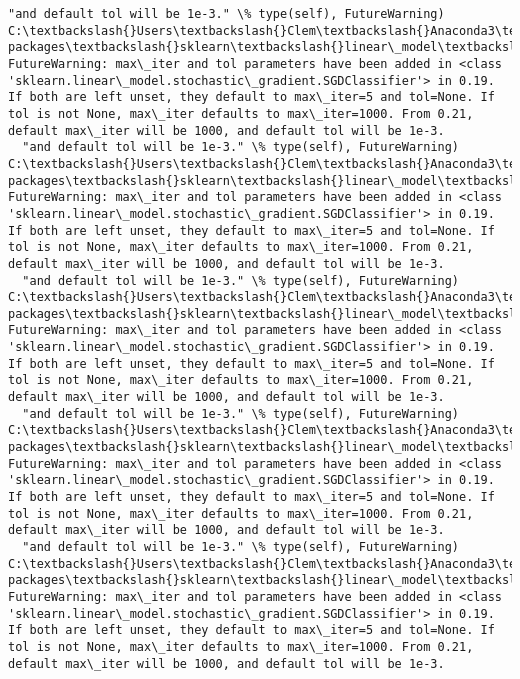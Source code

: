 \documentclass[11pt]{article}
\begin{document}
\begin{Verbatim}[commandchars=\\\{\}]
  "and default tol will be 1e-3." \% type(self), FutureWarning)
C:\textbackslash{}Users\textbackslash{}Clem\textbackslash{}Anaconda3\textbackslash{}lib\textbackslash{}site-packages\textbackslash{}sklearn\textbackslash{}linear\_model\textbackslash{}stochastic\_gradient.py:128: FutureWarning: max\_iter and tol parameters have been added in <class 'sklearn.linear\_model.stochastic\_gradient.SGDClassifier'> in 0.19. If both are left unset, they default to max\_iter=5 and tol=None. If tol is not None, max\_iter defaults to max\_iter=1000. From 0.21, default max\_iter will be 1000, and default tol will be 1e-3.
  "and default tol will be 1e-3." \% type(self), FutureWarning)
C:\textbackslash{}Users\textbackslash{}Clem\textbackslash{}Anaconda3\textbackslash{}lib\textbackslash{}site-packages\textbackslash{}sklearn\textbackslash{}linear\_model\textbackslash{}stochastic\_gradient.py:128: FutureWarning: max\_iter and tol parameters have been added in <class 'sklearn.linear\_model.stochastic\_gradient.SGDClassifier'> in 0.19. If both are left unset, they default to max\_iter=5 and tol=None. If tol is not None, max\_iter defaults to max\_iter=1000. From 0.21, default max\_iter will be 1000, and default tol will be 1e-3.
  "and default tol will be 1e-3." \% type(self), FutureWarning)
C:\textbackslash{}Users\textbackslash{}Clem\textbackslash{}Anaconda3\textbackslash{}lib\textbackslash{}site-packages\textbackslash{}sklearn\textbackslash{}linear\_model\textbackslash{}stochastic\_gradient.py:128: FutureWarning: max\_iter and tol parameters have been added in <class 'sklearn.linear\_model.stochastic\_gradient.SGDClassifier'> in 0.19. If both are left unset, they default to max\_iter=5 and tol=None. If tol is not None, max\_iter defaults to max\_iter=1000. From 0.21, default max\_iter will be 1000, and default tol will be 1e-3.
  "and default tol will be 1e-3." \% type(self), FutureWarning)
C:\textbackslash{}Users\textbackslash{}Clem\textbackslash{}Anaconda3\textbackslash{}lib\textbackslash{}site-packages\textbackslash{}sklearn\textbackslash{}linear\_model\textbackslash{}stochastic\_gradient.py:128: FutureWarning: max\_iter and tol parameters have been added in <class 'sklearn.linear\_model.stochastic\_gradient.SGDClassifier'> in 0.19. If both are left unset, they default to max\_iter=5 and tol=None. If tol is not None, max\_iter defaults to max\_iter=1000. From 0.21, default max\_iter will be 1000, and default tol will be 1e-3.
  "and default tol will be 1e-3." \% type(self), FutureWarning)
C:\textbackslash{}Users\textbackslash{}Clem\textbackslash{}Anaconda3\textbackslash{}lib\textbackslash{}site-packages\textbackslash{}sklearn\textbackslash{}linear\_model\textbackslash{}stochastic\_gradient.py:128: FutureWarning: max\_iter and tol parameters have been added in <class 'sklearn.linear\_model.stochastic\_gradient.SGDClassifier'> in 0.19. If both are left unset, they default to max\_iter=5 and tol=None. If tol is not None, max\_iter defaults to max\_iter=1000. From 0.21, default max\_iter will be 1000, and default tol will be 1e-3.

\end{Verbatim}
\end{document}
